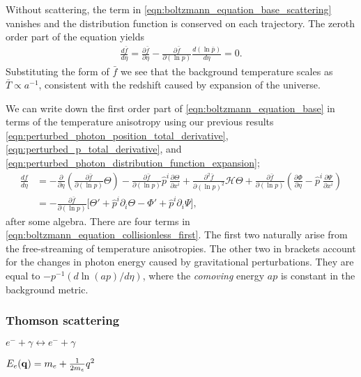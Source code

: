 Without scattering, the term in \eqref{eqn:boltzmann_equation_base_scattering} vanishes and the distribution function is conserved on each trajectory. The zeroth order part of the equation yields
\begin{align}
	\frac{d\bar{f}}{d\eta} = \frac{\partial \bar{f}}{\partial\eta} - \frac{\partial \bar{f}}{\partial(\ln p)}\frac{d(\ln\bar{p})}{d\eta} = 0. \label{eqn:boltzmann_equation_collisionless_zeroth}
\end{align}
Substituting the form of $\bar{f}$ we see that the background temperature scales as $\bar{T}\propto a^{-1}$, consistent with the redshift caused by expansion of the universe.

We can write down the first order part of \eqref{eqn:boltzmann_equation_base} in terms of the temperature anisotropy using our previous results \eqref{eqn:perturbed_photon_position_total_derivative}, \eqref{eqn:perturbed_p_total_derivative}, and \eqref{eqn:perturbed_photon_distribution_function_expansion};
\begin{align}
	\frac{df}{d\eta} &= - \frac{\partial}{\partial\eta} \left( \frac{\partial \bar{f}}{\partial(\ln p)} \Theta \right) - \frac{\partial \bar{f}}{\partial (\ln p)} \hat{p}^i \frac{\partial \Theta}{\partial x^i} +  \frac{\partial^2 \bar{f}}{\partial(\ln p)^2} \mathcal{H}\Theta + \frac{\partial \bar{f}}{\partial (\ln p)} \left( \frac{\partial \Phi}{\partial \eta} - \hat{p}^i \frac{\partial \Psi}{\partial x^i} \right) \\
	&= - \frac{\partial \bar{f}}{\partial (\ln p)} \biggl[ \Theta' + \hat{p}^i \partial_i \Theta - \Phi' + \hat{p}^i \partial_i \Psi \biggr], \label{eqn:boltzmann_equation_collisionless_first}
\end{align}
after some algebra. There are four terms in \eqref{eqn:boltzmann_equation_collisionless_first}. The first two naturally arise from the free-streaming of temperature anisotropies. The other two in brackets account for the changes in photon energy caused by gravitational perturbations. They are equal to $-p^{-1}(d \ln(ap)/d\eta)$, where the \textit{comoving} energy $ap$ is constant in the background metric.

\subsubsection*{Thomson scattering} \label{section:thompson_scattering}

$e^- + \gamma \leftrightarrow e^- + \gamma$

$E_e (\mathbf{q}) = m_e + \frac{1}{2m_e} q^2$

